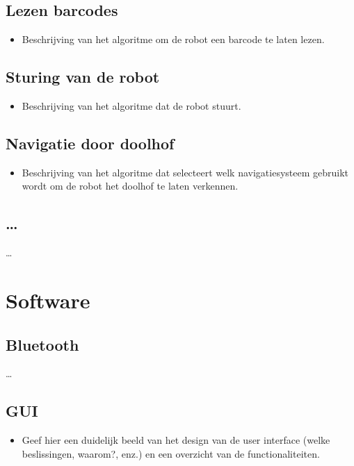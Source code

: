 \documentclass[tt1]{penoverslag}
\begin{document}
\subsection{Lezen barcodes}
\begin{itemize}
\item Beschrijving van het algoritme om de robot een barcode te laten lezen.
\end{itemize}

\subsection{Sturing van de robot}
\begin{itemize}
\item Beschrijving van het algoritme dat de robot stuurt.
\end{itemize}

\subsection{Navigatie door doolhof}
\begin{itemize}
\item Beschrijving van het algoritme dat selecteert welk navigatiesysteem gebruikt wordt om de robot het doolhof te laten verkennen.
\end{itemize}

\subsection{\ldots}
\ldots


\section{Software}
\lipsum[5]

\subsection{Bluetooth}
\ldots

\subsection{GUI}
\begin{itemize}
\item Geef hier een duidelijk beeld van het design van de user interface (welke beslissingen, waarom?, enz.) en een overzicht van de functionaliteiten.
\end{itemize}
\end{document}
